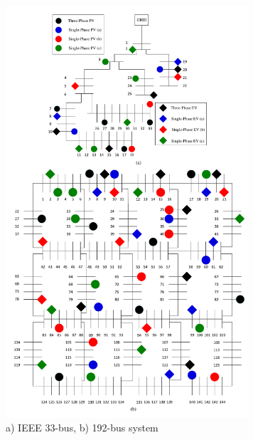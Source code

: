 \documentclass[journal]{IEEEtran}
\begin{document}
\begin{figure}
\centering
\includegraphics[width=9cm]{pdf/33 and 192 bus.pdf}
\caption{a) IEEE 33-bus, b) 192-bus system}
\label{33_Bus_system}
\end{figure}
\end{document}

